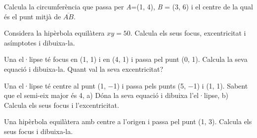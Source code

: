 \begin{activitats}
\begin{mylist}
\item  Calcula la circumferència que passa per \textit{A}=(1, 4), \textit{B} = (3, 6) i el centre de la qual és el punt mitjà de $\overline{AB}$.


\item  Considera la hipèrbola equilàtera $xy=50$. Calcula els seus focus, excentricitat i asímptotes i dibuixa-la.
 

\item  Una el·lipse té focus en (1, 1) i en (4, 1) i passa pel punt (0, 1). Calcula la seva equació i dibuixa-la. Quant val la seva excentricitat?


\item  Una el·lipse té centre al punt (1, $-$1) i passa pels punts (5, $-$1) i (1, 1). Sabent que el semi-eix major és 4, a) Dóna la seva equació i dibuixa l'el·lipse, b) Calcula els seus focus i l'excentricitat.  


\item  Una hipèrbola equilàtera amb centre a l'origen i passa pel punt (1, 3). Calcula els seus focus i dibuixa-la.



\end{mylist}
\end{activitats}
